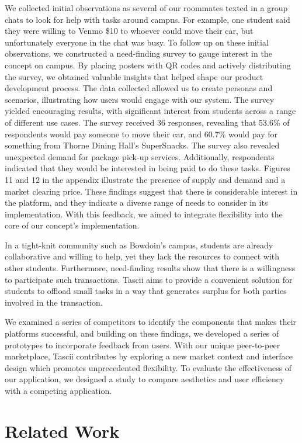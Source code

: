 We collected initial observations as several of our roommates texted in a group chats to look for help with tasks around campus. For example, one student said they were willing to Venmo \$10 to whoever could move their car, but unfortunately everyone in the chat was busy. To follow up on these initial observations, we constructed a need-finding survey to gauge interest in the concept on campus. By placing posters with QR codes and actively distributing the survey, we obtained valuable insights that helped shape our product development process. The data collected allowed us to create personas and scenarios, illustrating how users would engage with our system. The survey yielded encouraging results, with significant interest from students across a range of different use cases. The survey received 36 responses, revealing that 53.6\% of respondents would pay someone to move their car, and 60.7\% would pay for something from Thorne Dining Hall's SuperSnacks. The survey also revealed unexpected demand for package pick-up services. Additionally, respondents indicated that they would be interested in being paid to do these tasks. Figures 11 and 12 in the appendix illustrate the presence of supply and demand and a market clearing price. These findings suggest that there is considerable interest in the platform, and they indicate a diverse range of needs to consider in its implementation. With this feedback, we aimed to integrate flexibility into the core of our concept's implementation.

In a tight-knit community such as Bowdoin's campus, students are already collaborative and willing to help, yet they lack the resources to connect with other students. Furthermore, need-finding results show that there is a willingness to participate such transactions. Tascii aims to provide a convenient solution for students to offload small tasks in a way that generates surplus for both parties involved in the transaction.

We examined a series of competitors to identify the components that makes their platforms successful, and building on these findings, we developed a series of prototypes to incorporate feedback from users. With our unique peer-to-peer marketplace, Tascii contributes by exploring a new market context and interface design which promotes unprecedented flexibility. To evaluate the effectiveness of our application, we designed a study to compare aesthetics and user efficiency with a competing application.


\section{Related Work}

